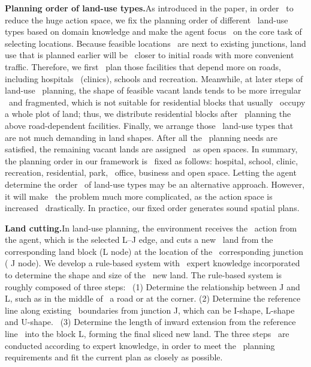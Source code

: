 \textbf{Planning order of land-use types.}As introduced in the paper, in order \
to reduce the huge action space, we fix the planning order of different \
land-use types based on domain knowledge and make the agent focus \
on the core task of selecting locations. Because feasible locations \
are next to existing junctions, land use that is planned earlier will be \
closer to initial roads with more convenient traffic. Therefore, we first \
plan those facilities that depend more on roads, including hospitals \
(clinics), schools and recreation. Meanwhile, at later steps of land-use \
planning, the shape of feasible vacant lands tends to be more irregular \
and fragmented, which is not suitable for residential blocks that usually \
occupy a whole plot of land; thus, we distribute residential blocks after \
planning the above road-dependent facilities. Finally, we arrange those \
land-use types that are not much demanding in land shapes. After all the \
planning needs are satisfied, the remaining vacant lands are assigned \
as open spaces. In summary, the planning order in our framework is \
fixed as follows: hospital, school, clinic, recreation, residential, park, \
office, business and open space. Letting the agent determine the order \
of land-use types may be an alternative approach. However, it will make \
the problem much more complicated, as the action space is increased \
drastically. In practice, our fixed order generates sound spatial plans.

\textbf{Land cutting.}In land-use planning, the environment receives the \
action from the agent, which is the selected L–J edge, and cuts a new \
land from the corresponding land block (L node) at the location of the \
corresponding junction ( J node). We develop a rule-based system with \
expert knowledge incorporated to determine the shape and size of the \
new land. The rule-based system is roughly composed of three steps: \
(1) Determine the relationship between J and L, such as in the middle of \
a road or at the corner. (2) Determine the reference line along existing \
boundaries from junction J, which can be I-shape, L-shape and U-shape. \
(3) Determine the length of inward extension from the reference line \
into the block L, forming the final sliced new land. The three steps \
are conducted according to expert knowledge, in order to meet the \
planning requirements and fit the current plan as closely as possible.

